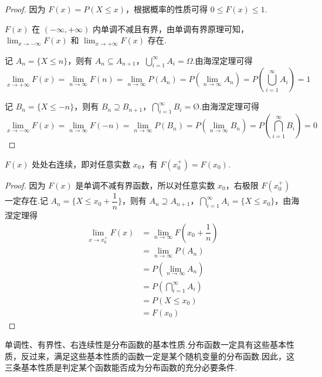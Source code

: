 \begin{proof}
    因为 $F(x) = P(X \leqslant x)$，根据概率的性质可得 $0 \leqslant F(x) \leqslant 1$.

    $F(x)$ 在 $(-\infty, +\infty)$ 内单调不减且有界，由单调有界原理可知，$\displaystyle\lim_{x \to -\infty} F(x)$ 和 $\displaystyle\lim_{x \to +\infty} F(x)$ 存在.

    记 $A_n = \{ X \leqslant n \}$，则有 $A_n \subseteq A_{n+1}$，$\displaystyle\bigcup_{i=1}^{\infty} A_i = \varOmega$.由海涅定理可得
    $$
    \lim_{x \to +\infty} F(x) = \lim_{n \to \infty} F(n) = \lim_{n \to \infty} P(A_n) = P(\lim_{n \to \infty} A_n) = P \left( \bigcup_{i=1}^{\infty} A_i \right) = 1
    $$

    记 $B_n = \{ X \leqslant -n \}$，则有 $B_n \supseteq B_{n+1}$，$\displaystyle\bigcap_{i=1}^{\infty} B_i = \text{\O}$.由海涅定理可得
    $$
    \lim_{x \to -\infty} F(x) = \lim_{n \to \infty} F(-n) = \lim_{n \to \infty} P(B_n) = P(\lim_{n \to \infty} B_n) = P \left( \bigcap_{i=1}^{\infty} B_i \right) = 0
    $$

    \vspace{-2em}
\end{proof}

\begin{property}[][右连续性]
    \indent $F(x)$ 处处右连续，即对任意实数 $x_0$，有 $F(x_0^+) = F(x_0)$.
\end{property}

\begin{proof}
    因为 $F(x)$ 是单调不减有界函数，所以对任意实数 $x_0$，右极限 $F(x_0^+)$ 一定存在.记 $A_n = \{ X \leqslant x_0 + \dfrac{1}{n} \}$，则有 $A_n \supseteq A_{n+1}$，$\displaystyle\bigcap_{i=1}^{\infty} A_i = \{ X \leqslant x_0 \}$，由海涅定理得
    $$
    \begin{aligned}
        \lim_{x \to x_0^+} F(x) &= \lim_{n \to \infty} F(x_0 + \dfrac{1}{n}) \\
        &= \lim_{n \to \infty} P(A_n) \\
        &= P(\lim_{n \to \infty} A_n) \\
        &= P \left( \bigcap_{i=1}^{\infty} A_i \right) \\
        &= P(X \leqslant x_0) \\
        &= F(x_0)
    \end{aligned}
    $$

    \vspace{-1em}
\end{proof}

单调性、有界性、右连续性是分布函数的基本性质.分布函数一定具有这些基本性质，反过来，满足这些基本性质的函数一定是某个随机变量的分布函数.因此，这三条基本性质是判定某个函数能否成为分布函数的充分必要条件.

